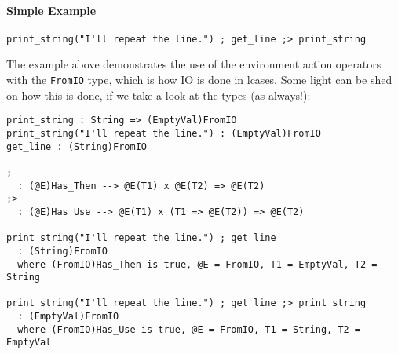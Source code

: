 \documentclass{article}
\begin{document}
\paragraph{Simple Example}
\begin{verbatim}
print_string("I'll repeat the line.") ; get_line ;> print_string
\end{verbatim}
The example above demonstrates the use of the environment action operators with
the \texttt{FromIO} type, which is how IO is done in lcases. Some light can
be shed on how this is done, if we take a look at the types (as always!):
\begin{verbatim}
print_string : String => (EmptyVal)FromIO
print_string("I'll repeat the line.") : (EmptyVal)FromIO
get_line : (String)FromIO

; 
  : (@E)Has_Then --> @E(T1) x @E(T2) => @E(T2) 
;>
  : (@E)Has_Use --> @E(T1) x (T1 => @E(T2)) => @E(T2) 

print_string("I'll repeat the line.") ; get_line
  : (String)FromIO
  where (FromIO)Has_Then is true, @E = FromIO, T1 = EmptyVal, T2 = String

print_string("I'll repeat the line.") ; get_line ;> print_string
  : (EmptyVal)FromIO
  where (FromIO)Has_Use is true, @E = FromIO, T1 = String, T2 = EmptyVal
\end{verbatim}
\end{document}
